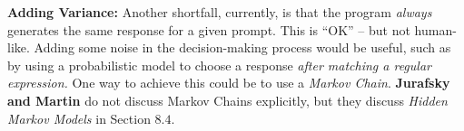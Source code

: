 \begin{enumarabic}
  \item \textbf{Adding Variance:}
    Another shortfall, currently, is that the program \emph{always}
    generates the same response for a given prompt.
    This is ``OK'' -- but not human-like.
    Adding some noise in the decision-making process
    would be useful, such as by using a probabilistic model
    to choose a response \emph{after matching a regular expression.}
    One way to achieve this could be to use a \emph{Markov Chain}.
    \textbf{Jurafsky and Martin} do not discuss Markov Chains explicitly,
    but they discuss \emph{Hidden Markov Models} in Section $8.4$.

\end{enumarabic}
